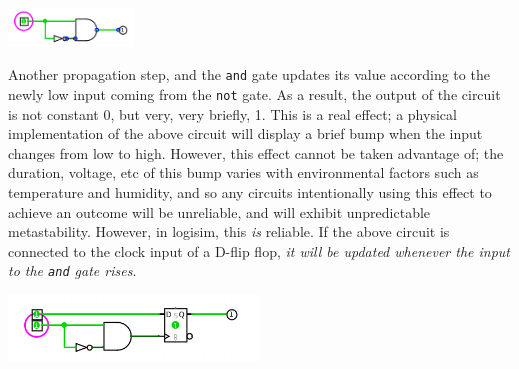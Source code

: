 \documentclass{article}
\def\gate#1{\uppercase{\Verb|#1|}}
\begin{document}
	\begin{center}\includegraphics[width=0.25\textwidth]{images/spurious_1.png}\end{center}

Another propagation step, and the \gate{and} gate updates its value according to the newly low input coming from the \gate{not} gate. As a result, the output of the circuit is not constant 0, but very, very briefly, 1. This is a real effect; a physical implementation of the above circuit will display a brief bump when the input changes from low to high. However, this effect cannot be taken advantage of; the duration, voltage, etc of this bump varies with environmental factors such as temperature and humidity, and so any circuits intentionally using this effect to achieve an outcome will be unreliable, and will exhibit unpredictable metastability. However, in logisim, this \textit{is} reliable. If the above circuit is connected to the clock input of a D-flip flop, \textit{it will be updated whenever the input to the \gate{and} gate rises}.

	\begin{center}\includegraphics[width=0.5\textwidth]{images/spurious_clock.png}\end{center}
\end{document}
